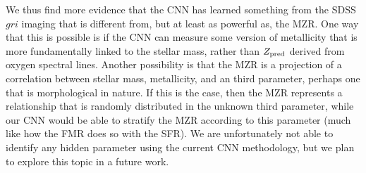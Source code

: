 \documentclass[fleqn,usenatbib]{mnras}
\begin{document}
We thus find more evidence that the CNN has learned something from the SDSS $gri$ imaging that is different from, but at least as powerful as, the MZR.
One way that this is possible is if the CNN can measure some version of metallicity that is more fundamentally linked to the stellar mass, rather than $Z_{\rm pred}$ derived from oxygen spectral lines.
Another possibility is that the MZR is a projection of a correlation between stellar mass, metallicity, and an third parameter, perhaps one that is morphological in nature.
If this is the case, then the \cite{Tremonti2004} MZR represents a relationship that is randomly distributed in the unknown third parameter, while our CNN would be able to stratify the MZR according to this parameter (much like how the FMR does so with the SFR).
We are unfortunately not able to identify any hidden parameter using the current CNN methodology, but we plan to explore this topic in a future work.




%
\end{document}
